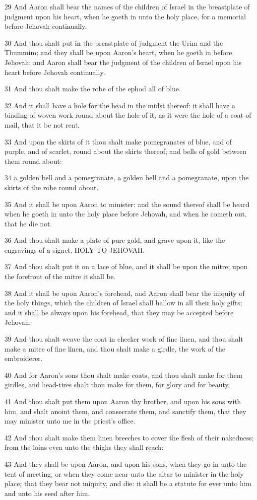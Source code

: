 \par 29 And Aaron shall bear the names of the children of Israel in the breastplate of judgment upon his heart, when he goeth in unto the holy place, for a memorial before Jehovah continually.
\par 30 And thou shalt put in the breastplate of judgment the Urim and the Thummim; and they shall be upon Aaron's heart, when he goeth in before Jehovah: and Aaron shall bear the judgment of the children of Israel upon his heart before Jehovah continually.
\par 31 And thou shalt make the robe of the ephod all of blue.
\par 32 And it shall have a hole for the head in the midst thereof: it shall have a binding of woven work round about the hole of it, as it were the hole of a coat of mail, that it be not rent.
\par 33 And upon the skirts of it thou shalt make pomegranates of blue, and of purple, and of scarlet, round about the skirts thereof; and bells of gold between them round about:
\par 34 a golden bell and a pomegranate, a golden bell and a pomegranate, upon the skirts of the robe round about.
\par 35 And it shall be upon Aaron to minister: and the sound thereof shall be heard when he goeth in unto the holy place before Jehovah, and when he cometh out, that he die not.
\par 36 And thou shalt make a plate of pure gold, and grave upon it, like the engravings of a signet, HOLY TO JEHOVAH.
\par 37 And thou shalt put it on a lace of blue, and it shall be upon the mitre; upon the forefront of the mitre it shall be.
\par 38 And it shall be upon Aaron's forehead, and Aaron shall bear the iniquity of the holy things, which the children of Israel shall hallow in all their holy gifts; and it shall be always upon his forehead, that they may be accepted before Jehovah.
\par 39 And thou shalt weave the coat in checker work of fine linen, and thou shalt make a mitre of fine linen, and thou shalt make a girdle, the work of the embroiderer.
\par 40 And for Aaron's sons thou shalt make coats, and thou shalt make for them girdles, and head-tires shalt thou make for them, for glory and for beauty.
\par 41 And thou shalt put them upon Aaron thy brother, and upon his sons with him, and shalt anoint them, and consecrate them, and sanctify them, that they may minister unto me in the priest's office.
\par 42 And thou shalt make them linen breeches to cover the flesh of their nakedness; from the loins even unto the thighs they shall reach:
\par 43 And they shall be upon Aaron, and upon his sons, when they go in unto the tent of meeting, or when they come near unto the altar to minister in the holy place; that they bear not iniquity, and die: it shall be a statute for ever unto him and unto his seed after him.

